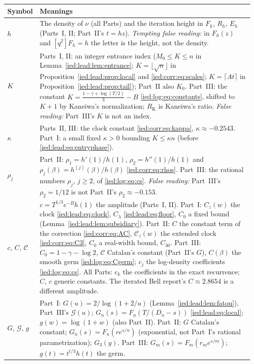 \documentclass[11pt,letterpaper]{article}
\theoremstyle{remark}\newtheorem{remark}[theorem]{Remark}
\begin{document}
\begin{longtable}{@{}>{\raggedright\arraybackslash}p{} >{\raggedright\arraybackslash}p{}@{}}
\toprule
Symbol & Meanings\\
\midrule
\endhead
$h$ & The density of $\nu$ (all Parts) and the iteration height in $F_h$, $R_h$, $E_h$ (Parts~I, II; Part~II's $t=hz$). \emph{Tempting false reading:} in $F_h(z)$ and $[q^2]F_h=h$ the letter is the height, not the density.\\
$K$ & Parts~I, II: an integer entrance index ($M_0\le K\le n$ in Lemma~\ref{ied:lead:lem:entrance}; $K=\lfloor\sqrt n\rfloor$ in Proposition~\ref{ied:lead:prop:local} and \eqref{ied:corr:eq:scales}; $K=\lceil At\rceil$ in Proposition~\ref{ied:lead:prop:tail}); Part~II also $K_0$. Part~III: the constant $K=\frac{1-\gamma+\log(T/2)}3-B$ \eqref{ied:log:eq:constants}, shifted to $K+1$ by Kaneiwa's normalization; $R_{\mathrm K}$ is Kaneiwa's ratio. \emph{False reading:} Part~III's $K$ is not an index.\\
$\kappa$ & Parts~II, III: the clock constant \eqref{ied:corr:eq:kappa}, $\kappa\approx-0.2543$. Part~I: a small fixed $\kappa>0$ bounding $K\le\kappa n$ (before \eqref{ied:lead:eq:entryphase}).\\
$\rho_j$ & Part~II: $\rho_1=h'(1)/h(1)$, $\rho_2=h''(1)/h(1)$ and $\rho_j(\beta)=h^{(j)}(\beta)/h(\beta)$ \eqref{ied:corr:eq:rhos}. Part~III: the rational numbers $\rho_j$, $j\ge2$, of \eqref{ied:log:eq:cs}. \emph{False reading:} Part~III's $\rho_2=1/12$ is not Part~II's $\rho_2\approx-0.153$.\\
$c$, $C$, $\mathcal C$ & $c=T^{1/3}e^{-B}h(1)$ the amplitude (Parts~I, II). Part~I: $C_z(w)$ the clock \eqref{ied:lead:eq:clock}, $C_\lambda$ \eqref{ied:lead:eq:floor}, $C_0$ a fixed bound (Lemma~\ref{ied:lead:lem:subsidiary}). Part~II: $C$ the constant term of the correction \eqref{ied:corr:eq:AC}, $\mathcal C_z(w)$ the extended clock \eqref{ied:corr:eq:C3}, $C_0$ a real-width bound, $C_{30}$. Part~III: $C_0=1-\gamma-\log2$, $\mathcal C$ Catalan's constant (Part~II's $G$), $C(\beta)$ the smooth germ \eqref{ied:log:eq:Cgerm}; $c_j$ the log-density coefficients \eqref{ied:log:eq:cs}. All Parts: $c_k$ the coefficients in the exact recurrence; $C$, $c$ generic constants. The iterated Bell report's $C\approx2.8654$ is a different amplitude.\\
$G$, $\mathcal G$, $g$ & Part~I: $G(u)=2/\log(1+2/u)$ (Lemma~\ref{ied:lead:lem:fatou}), Part~III's $\mathcal G(u)$; $G_n(s)=F_n(T/(D_n-s))$ \eqref{ied:lead:eq:local}; $g(w)=\log(1+w)$ (also Part~II). Part~II: $G$ Catalan's constant; $G_n(s)=F_n(re^{s/n})$ (exponential, not Part~I's rational parametrization); $G_3(y)$. Part~III: $G_m(s)=F_m(r_me^{s/m})$; $g(t)=t^{t/3}h(t)$ the germ.\\

\end{longtable}
\end{document}
